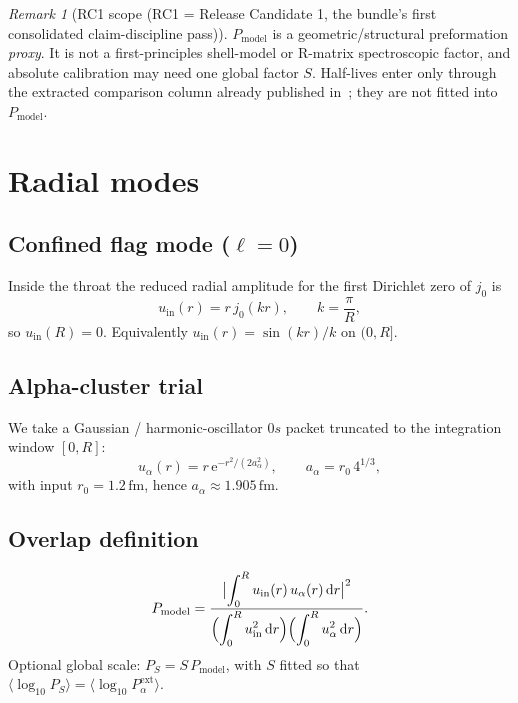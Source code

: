 \documentclass[11pt,a4paper]{article}
\theoremstyle{remark}
\newtheorem*{remark}{Remark}
\newcommand{\dd}{\mathrm{d}}
\newcommand{\ee}{\mathrm{e}}
\begin{document}
\begin{remark}[RC1 scope (RC1 = Release Candidate 1, the bundle's first consolidated claim-discipline pass)]
$P_{\mathrm{model}}$ is a geometric/structural preformation \emph{proxy}.
It is not a first-principles shell-model or R-matrix spectroscopic factor,
and absolute calibration may need one global factor $S$.  Half-lives enter
only through the extracted comparison column already published
in~\cite{NuclearDecay2026}; they are not fitted into $P_{\mathrm{model}}$.
\end{remark}

\section{Radial modes}

\subsection{Confined flag mode ($\ell=0$)}
Inside the throat the reduced radial amplitude for the first Dirichlet zero
of $j_0$ is
\begin{equation}
u_{\mathrm{in}}(r) = r\, j_0(k r),\qquad k=\frac{\pi}{R},
\end{equation}
so $u_{\mathrm{in}}(R)=0$.  Equivalently $u_{\mathrm{in}}(r)=\sin(kr)/k$ on
$(0,R]$.

\subsection{Alpha-cluster trial}
We take a Gaussian / harmonic-oscillator $0s$ packet truncated to the
integration window $[0,R]$:
\begin{equation}
u_\alpha(r) = r\,\ee^{-r^2/(2 a_\alpha^2)},\qquad
a_\alpha = r_0\, 4^{1/3},
\end{equation}
with input $r_0=1.2\,\mathrm{fm}$, hence $a_\alpha\approx 1.905\,\mathrm{fm}$.

\subsection{Overlap definition}
\begin{equation}
P_{\mathrm{model}}
=
\frac{\bigl|\displaystyle\int_0^R u_{\mathrm{in}}(r)\,u_\alpha(r)\,\dd r\bigr|^2}
{\displaystyle
\Bigl(\int_0^R u_{\mathrm{in}}^2\,\dd r\Bigr)
\Bigl(\int_0^R u_\alpha^2\,\dd r\Bigr)}.
\end{equation}
Optional global scale: $P_S = S\, P_{\mathrm{model}}$, with $S$ fitted so that
$\langle\log_{10} P_S\rangle=\langle\log_{10} P_\alpha^{\mathrm{ext}}\rangle$.
\end{document}
